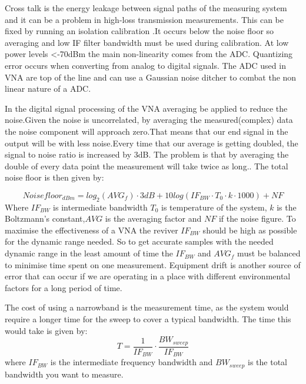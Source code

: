 Cross talk is the energy leakage between signal paths of the measuring system and it can be a problem in high-loss transmission measurements. This can be fixed by running an isolation calibration \citep{crosstalk}.It occurs below the noise floor so averaging and low \gls{IF} filter bandwidth must be used during calibration.
At low power levels <-70dBm the main non-linearity comes from the \gls{ADC}. Quantizing error occurs when converting from analog to digital signals. The \gls{ADC} used in \gls{VNA} are top of the line and can use a Gaussian noise ditcher to combat the non linear nature of a \gls{ADC}. 


In the digital signal processing of the \gls{VNA} averaging be applied to reduce the noise.Given the noise is uncorrelated, by averaging the measured(complex) data the noise component will approach zero.That means that our end signal in the output will be with less noise.Every time that our average is getting doubled, the signal to noise ratio is increased by 3dB. The problem is that by averaging the double of every data point the measurement will take twice as long.\citep{KeysightAVG}. The total noise floor is then given by:

\begin{equation}
Noisefloor_{dBm} = log_{2}(AVG_f)\cdot 3dB +10log(IF_{BW}\cdot T_{0}\cdot k\cdot 1000) + NF 
\label{NFwithAVG}
\end{equation}
Where $IF_{BW}$ is  intermediate bandwidth $T_0$ is temperature of the system, $k$ is the Boltzmann's constant,$AVG$ is the averaging factor and $NF$ if the noise figure.
To maximise the effectiveness of a \gls{VNA} the reviver $IF_{BW}$ should be high as possible for the dynamic range needed. So to get accurate samples with the needed dynamic range in the least amount of time the $IF_{BW}$ and $AVG_f$ must be balanced to minimise time spent on one measurement.
Equipment drift is another source of error that can occur if we are operating in a place with different environmental factors for a long period of time.

The cost of using a narrowband is the measurement time, as the system would require a longer time for the sweep to cover a typical bandwidth. The time this would take is given by:
\begin{equation}
T = \frac{1}{IF_{BW}} \cdot \frac{BW_{sweep}}{IF_{BW}}
\end{equation}
where $IF_{BW}$ is the intermediate frequency bandwidth and $BW_{sweep}$ is the total bandwidth you want to measure.


